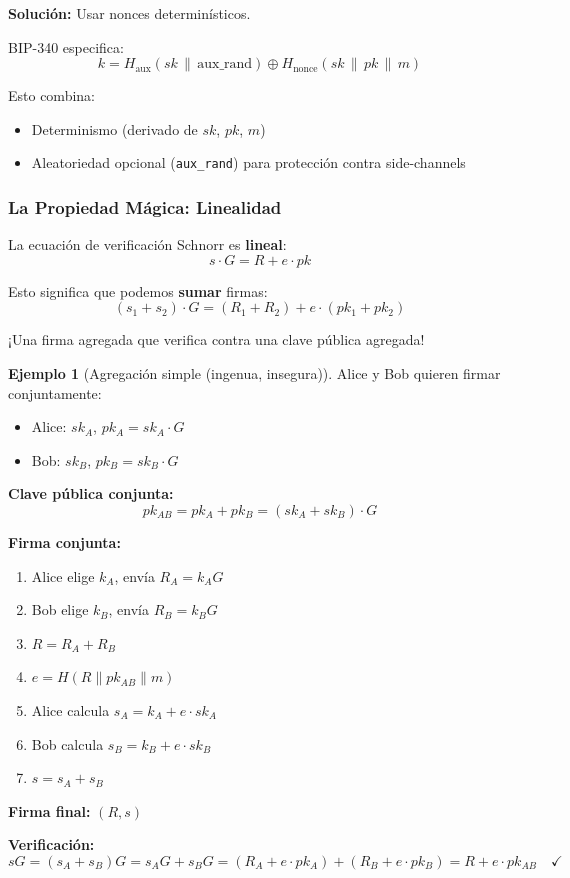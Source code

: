 \documentclass[11pt,a4paper,twoside,openright]{book}
\theoremstyle{definition}
\newtheorem{example}{Ejemplo}[chapter]
\theoremstyle{plain}
\theoremstyle{remark}
\begin{document}
\begin{keyidea}
\textbf{Solución:} Usar nonces determinísticos.

BIP-340 especifica:
\[ k = H_{\text{aux}}(sk \,\|\, \text{aux\_rand}) \oplus H_{\text{nonce}}(sk \,\|\, pk \,\|\, m) \]

Esto combina:
\begin{itemize}
    \item Determinismo (derivado de $sk$, $pk$, $m$)
    \item Aleatoriedad opcional (\texttt{aux\_rand}) para protección contra side-channels
\end{itemize}
\end{keyidea}

\subsubsection{La Propiedad Mágica: Linealidad}

\begin{keyidea}
La ecuación de verificación Schnorr es \textbf{lineal}:
\[ s \cdot G = R + e \cdot pk \]

Esto significa que podemos \textbf{sumar} firmas:
\[ (s_1 + s_2) \cdot G = (R_1 + R_2) + e \cdot (pk_1 + pk_2) \]

¡Una firma agregada que verifica contra una clave pública agregada!
\end{keyidea}

\begin{example}[Agregación simple (ingenua, insegura)]
Alice y Bob quieren firmar conjuntamente:
\begin{itemize}
    \item Alice: $sk_A$, $pk_A = sk_A \cdot G$
    \item Bob: $sk_B$, $pk_B = sk_B \cdot G$
\end{itemize}

\textbf{Clave pública conjunta:}
\[ pk_{AB} = pk_A + pk_B = (sk_A + sk_B) \cdot G \]

\textbf{Firma conjunta:}
\begin{enumerate}
    \item Alice elige $k_A$, envía $R_A = k_A G$
    \item Bob elige $k_B$, envía $R_B = k_B G$
    \item $R = R_A + R_B$
    \item $e = H(R \| pk_{AB} \| m)$
    \item Alice calcula $s_A = k_A + e \cdot sk_A$
    \item Bob calcula $s_B = k_B + e \cdot sk_B$
    \item $s = s_A + s_B$
\end{enumerate}

\textbf{Firma final:} $(R, s)$

\textbf{Verificación:}
\[ sG = (s_A + s_B)G = s_A G + s_B G = (R_A + e \cdot pk_A) + (R_B + e \cdot pk_B) = R + e \cdot pk_{AB} \quad \checkmark \]
\end{example}
\end{document}
